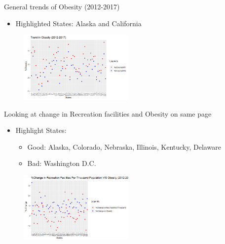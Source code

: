 \documentclass{beamer} %
\begin{document}
\begin{frame}{General trends of Obesity (2012-2017)}
 \begin{itemize}
  \item Highlighted States: Alaska and California
 \end{itemize}
 \begin{figure}
   \includegraphics[width=0.5\textwidth]{ObesityTrend.png}
   \hfill
 \end{figure}
\end{frame}

\begin{frame}{Looking at change in Recreation facilities and Obesity on same page}
  \begin{itemize}
   \item Highlight States:
   \begin{itemize}
    \item Good: Alaska, Colorado, Nebraska, Illinois, Kentucky, Delaware
    \item Bad: Washington D.C.
   \end {itemize}
  \end{itemize}
 \begin{figure}
   \includegraphics[width=0.5\textwidth]{ObesityRecPTH.png}
   \hfill
 \end{figure}
\end{frame}

\end{document}
